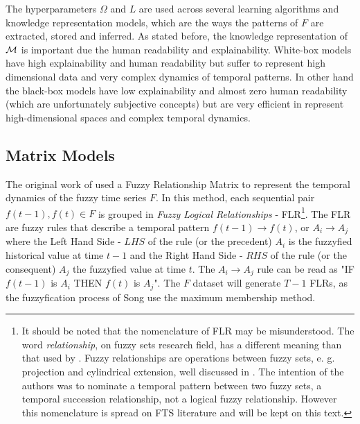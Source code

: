 The hyperparameters $\Omega$ and $L$ are used across several learning algorithms and knowledge representation models, which are the ways the patterns of $F$ are extracted, stored and inferred. As stated before, the knowledge representation of $\mathcal{M}$ is important due the human readability and explainability. White-box models have high explainability and human readability but suffer to represent high dimensional data and very complex dynamics of temporal patterns. In other hand the black-box models have low explainability and almost zero human readability (which are unfortunately subjective concepts) but are very efficient in represent high-dimensional spaces and complex temporal dynamics.


%
\subsection{Matrix Models}
\label{sec:fts_matrix}

The original work of \cite{song1993fuzzy} used a Fuzzy Relationship Matrix to represent the temporal dynamics of the fuzzy time series $F$. In this method, each sequential pair $f(t-1),f(t) \in F$ is grouped in \textit{Fuzzy Logical Relationships} - FLR\footnote{It should be noted that the nomenclature of FLR may be misunderstood. The word \textit{relationship}, on fuzzy sets research field, has a different meaning than that used by \citeauthor{song1993fuzzy}. Fuzzy relationships are operations between fuzzy sets, e. g. projection and cylindrical extension, well discussed in \cite{Klir1995}. The intention of the authors was to nominate a temporal pattern between two fuzzy sets, a temporal succession relationship, not a logical fuzzy relationship.  However this nomenclature is spread on FTS literature and will be kept on this text.}. The FLR are fuzzy rules that describe a temporal pattern $f(t-1) \rightarrow f(t)$, or $A_i \rightarrow A_j$ where the Left Hand Side - $LHS$ of the rule (or the precedent)  $A_i$ is the fuzzyfied historical value at time $t-1$ and the Right Hand Side - $RHS$ of the rule (or the consequent) $A_j$ the fuzzyfied value at time $t$. The $A_i \rightarrow A_j$ rule can be read as "IF $f(t-1)$ is $A_i$ THEN $f(t)$ is $A_j$". The $F$ dataset will generate $T-1$ FLRs, as the fuzzyfication process of Song use the maximum membership method.

